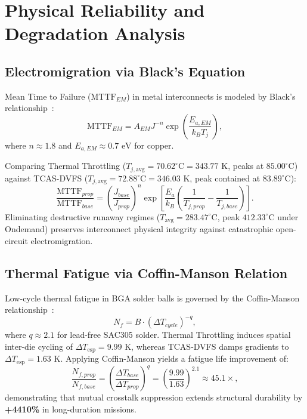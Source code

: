 \documentclass[journal]{IEEEtran}
\begin{document}
\section{Physical Reliability and Degradation Analysis}

\subsection{Electromigration via Black's Equation}
Mean Time to Failure ($\text{MTTF}_{EM}$) in metal interconnects is modeled by Black's relationship~\cite{black1969electromigration}:
\begin{equation}
\text{MTTF}_{EM} = A_{EM} J^{-n} \exp\left( \frac{E_{a, EM}}{k_B T_j} \right),
\end{equation}
where $n \approx 1.8$ and $E_{a, EM} \approx 0.7\text{ eV}$ for copper.

Comparing Thermal Throttling ($T_{j, \text{avg}} = 70.62^\circ\text{C} = 343.77\text{ K}$, peaks at $85.00^\circ\text{C}$) against TCAS-DVFS ($T_{j, \text{avg}} = 72.88^\circ\text{C} = 346.03\text{ K}$, peak contained at $83.89^\circ\text{C}$):
\begin{equation}
\frac{\text{MTTF}_{prop}}{\text{MTTF}_{base}} = \left( \frac{J_{base}}{J_{prop}} \right)^n \exp\left[ \frac{E_{a}}{k_B} \left( \frac{1}{T_{j, prop}} - \frac{1}{T_{j, base}} \right) \right].
\end{equation}
Eliminating destructive runaway regimes ($T_{\text{avg}} = 283.47^\circ\text{C}$, peak $412.33^\circ\text{C}$ under Ondemand) preserves interconnect physical integrity against catastrophic open-circuit electromigration.

\subsection{Thermal Fatigue via Coffin-Manson Relation}
Low-cycle thermal fatigue in BGA solder balls is governed by the Coffin-Manson relationship~\cite{manson1966fatigue, ecss2008thermal}:
\begin{equation}
N_f = B \cdot (\Delta T_{cycle})^{-q},
\end{equation}
where $q \approx 2.1$ for lead-free SAC305 solder. Thermal Throttling induces spatial inter-die cycling of $\Delta T_{\text{esp}} = 9.99\text{ K}$, whereas TCAS-DVFS damps gradients to $\Delta T_{\text{esp}} = 1.63\text{ K}$. Applying Coffin-Manson yields a fatigue life improvement of:
\begin{equation}
\frac{N_{f, prop}}{N_{f, base}} = \left( \frac{\Delta T_{base}}{\Delta T_{prop}} \right)^q = \left( \frac{9.99}{1.63} \right)^{2.1} \approx \mathbf{45.1\times},
\end{equation}
demonstrating that mutual crosstalk suppression extends structural durability by \textbf{+4410\%} in long-duration missions.
\end{document}
